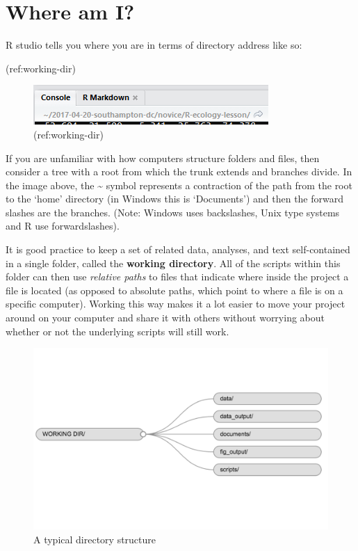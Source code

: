 \documentclass[12pt,]{book}
\theoremstyle{definition}
\theoremstyle{definition}
\theoremstyle{definition}
\theoremstyle{remark}
\begin{document}
\section{Where am I?}\label{where-am-i}

R studio tells you where you are in terms of directory address like so:

(ref:working-dir)

\begin{figure}

{\centering \includegraphics[width=0.8\linewidth]{img/rstudio_working_directory} 

}

\caption{(ref:working-dir)}\label{fig:working-directory}
\end{figure}

If you are unfamiliar with how computers structure folders and files,
then consider a tree with a root from which the trunk extends and
branches divide. In the image above, the \textasciitilde{} symbol
represents a contraction of the path from the root to the `home'
directory (in Windows this is `Documents') and then the forward slashes
are the branches. (Note: Windows uses backslashes, Unix type systems and
R use forwardslashes).

It is good practice to keep a set of related data, analyses, and text
self-contained in a single folder, called the \textbf{working
directory}. All of the scripts within this folder can then use
\emph{relative paths} to files that indicate where inside the project a
file is located (as opposed to absolute paths, which point to where a
file is on a specific computer). Working this way makes it a lot easier
to move your project around on your computer and share it with others
without worrying about whether or not the underlying scripts will still
work.



\begin{figure}

{\centering \includegraphics[width=0.8\linewidth]{img/R-ecology-work_dir_structure} 

}

\caption{A typical directory structure}\label{fig:dir-structure}
\end{figure}
\end{document}
